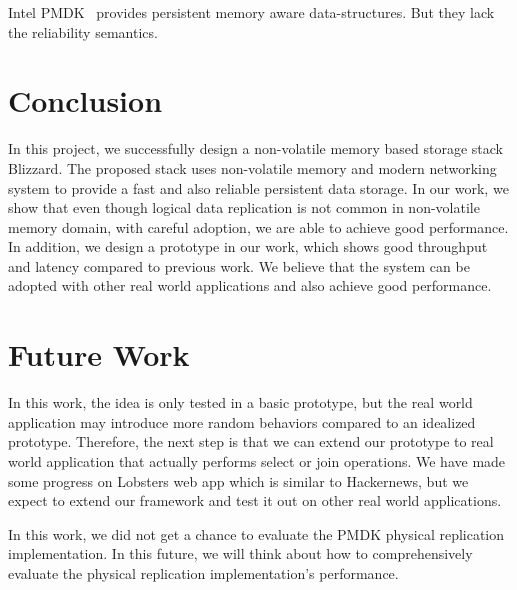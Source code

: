 Intel PMDK~\cite{pmdk} provides persistent memory aware data-structures. But they lack the reliability semantics.

\section{Conclusion}
In this project, we successfully design a non-volatile memory based storage stack Blizzard. The proposed stack uses non-volatile memory and modern networking system to provide a fast and also reliable persistent data storage. In our work, we show that even though logical data replication is not common in non-volatile memory domain, with careful adoption, we are able to achieve good performance. In addition, we design a prototype in our work, which shows good throughput and latency compared to previous work. We believe that the system can be adopted with other real world applications and also achieve good performance. 

\section{Future Work}
In this work, the idea is only tested in a basic prototype, but the real world application may introduce more random behaviors compared to an idealized prototype. Therefore, the next step is that we can extend our prototype to real world application that actually performs select or join operations. We have made some progress on Lobsters web app which is similar to Hackernews, but we expect to extend our framework and test it out on other real world applications. 

In this work, we did not get a chance to evaluate the PMDK physical replication implementation. In this future, we will think about how to comprehensively evaluate the physical replication implementation's performance. 
